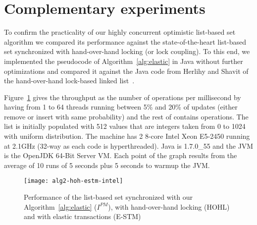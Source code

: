 \documentclass[11pt,pdftex,letterpaper]{article}
\begin{document}
\section{Complementary experiments}\label{sec:expe}
To confirm the practicality of our highly concurrent optimistic list-based set algorithm we compared its performance against the state-of-the-heart list-based set synchronized with hand-over-hand locking (or lock coupling).
To this end, we implemented the pseudocode of Algorithm~\ref{alg:elastic} in Java without further optimizations and compared it against the Java code from Herlihy and 
Shavit of the hand-over-hand lock-based linked list~\cite{HS08-book}. 

Figure~\ref{fig:alg2-vs-hoh} gives the throughput as the number of operations per millisecond by having from 1 to 64 threads running between 5\% and 
20\% of updates (either remove or insert with same probability) and the rest of contains operations. The list is initially populated with 512 values that are integers taken from 0 to 1024 with uniform distribution. The machine has 
2 8-core Intel Xeon E5-2450 running at 2.1GHz (32-way as each code is hyperthreaded).
Java is 1.7.0\_55 and the JVM is the OpenJDK 64-Bit Server VM. Each point of the graph results from the average of 10 runs of 5 seconds plus 5 seconds to warmup the JVM.
\begin{figure}
  \begin{center}
    \texttt{[image: alg2-hoh-estm-intel]}
    \caption{Performance of the list-based set synchronized with our Algorithm~\ref{alg:elastic} ($I^{PM}$), with hand-over-hand locking (HOHL) and with elastic transactions (E-STM)\label{fig:alg2-vs-hoh}}
  \end{center}
\end{figure}
\end{document}
